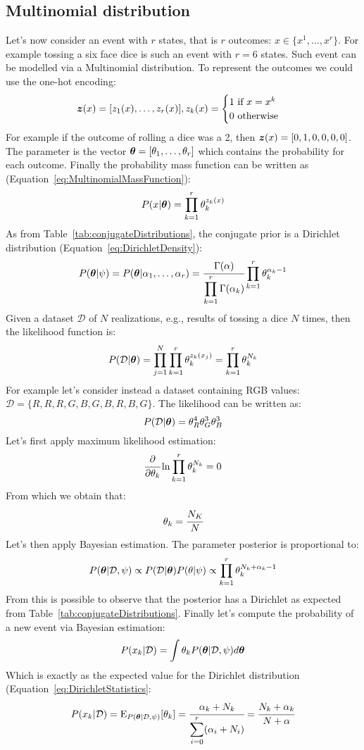 \subsection{Multinomial distribution}
Let's now consider an event with $r$ states, that is $r$ outcomes: $x\in\{x^1,\hdots,x^r\}$. For example tossing a six face dice is such an event with $r=6$ states.\newline
Such event can be modelled via a Multinomial distribution. To represent the outcomes we could use the one-hot encoding:
\[\bm{z}(x)=[z_1(x),\hdots,z_r(x)], z_k(x)=
\begin{cases}
	1~\text{if }x=x^k\\
	0~\text{otherwise}\\
\end{cases}
\]
For example if the outcome of rolling a dice was a 2, then $\bm{z}(x)=[0,1,0,0,0,0]$.\newline
The parameter is the vector $\bm{\theta}=[\theta_1,\hdots,\theta_r]$ which contains the probability for each outcome. \newline
Finally the probability mass function can be written as (Equation~\ref{eq:MultinomialMassFunction}):
\[
P(x\vert\bm{\theta})=\displaystyle\prod_{k=1}^r\theta_k^{z_k(x)}
\]
As from Table~\ref{tab:conjugateDistributions}, the conjugate prior is a Dirichlet distribution (Equation~\ref{eq:DirichletDensity}):
\[
P(\bm{\theta}\vert\psi)=P(\bm{\theta}\vert\alpha_1,\hdots,\alpha_r)=\cfrac{\Gamma(\alpha)}{\displaystyle\prod_{k=1}^r\Gamma(\alpha_k)}\displaystyle\prod_{k=1}^r\theta_k^{\alpha_{k}-1}
\]
Given a dataset $\mathcal{D}$ of $N$ realizations, e.g., results of tossing a dice $N$ times, then the likelihood function is:
\[
	P(\mathcal{D}\vert\bm{\theta})=\displaystyle\prod_{j=1}^N\displaystyle\prod_{k=1}^r\theta_k^{z_k(x_j)}=\displaystyle\prod_{k=1}^r\theta_k^{N_k}
\]
For example let's consider instead a dataset containing RGB values: $\mathcal{D}=\{R, R, R, G, B, G, B, R, B, G\}$. The likelihood can be written as:
\[
	P(\mathcal{D}\vert\bm{\theta})=\theta_R^4\theta_G^3\theta_B^3
\]
Let's first apply maximum likelihood estimation: 
\[
	\cfrac{\partial}{\partial\theta_k}\ln{\displaystyle\prod_{k=1}^r\theta_k^{N_k}}=0
\]
From which we obtain that:
\[
	\theta_k=\cfrac{N_K}{N}
\]
Let's then apply Bayesian estimation. The parameter posterior is proportional to:
\[
	P(\bm{\theta}\vert\mathcal{D},\psi)\propto P(\mathcal{D}\vert\bm{\theta})P(\theta\vert\psi)\propto\displaystyle\prod_{k=1}^r\theta_k^{N_k+\alpha_k-1}
\]
From this is possible to observe that the posterior has a Dirichlet as expected from Table~\ref{tab:conjugateDistributions}.
Finally let's compute the probability of a new event via Bayesian estimation:
\[
	P(x_k\vert\mathcal{D})=\int\theta_kP(\bm{\theta}\vert\mathcal{D},\psi)d\bm{\theta}
\]
Which is exactly as the expected value for the Dirichlet distribution (Equation~\ref{eq:DirichletStatistics}:
\[
	P(x_k\vert\mathcal{D})=\text{E}_{P(\bm{\theta}\vert\mathcal{D},\psi)}[\theta_k]=\cfrac{\alpha_k+N_k}{\displaystyle\sum_{i=0}^r(\alpha_i+N_i)}=\cfrac{N_k+\alpha_k}{N+\alpha}
\]